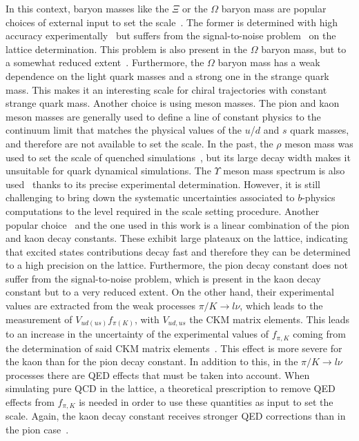 In this context, baryon masses like the $\Xi$ or the $\Omega$ baryon mass are popular choices of external input to set the scale~\citep{BMW:2012hcm,Miller:2020evg,RQCD_scale}. The former is determined with high accuracy experimentally~\citep{ParticleDataGroup:2020ssz} but suffers from the signal-to-noise problem~\citep{Lepage:1989hd,Luscher:2010ae} on the lattice determination. This problem is also present in the $\Omega$ baryon mass, but to a somewhat reduced extent~\citep{BMW:2012hcm,Miller:2020evg}. Furthermore, the $\Omega$ baryon mass has a weak dependence on the light quark masses and a strong one in the strange quark mass. This makes it an interesting scale for chiral trajectories with constant strange quark mass. Another choice is using meson masses. The pion and kaon meson masses are generally used to define a line of constant physics to the continuum limit that matches the physical values of the $u$/$d$ and $s$ quark masses, and therefore are not available to set the scale. In the past, the $\rho$ meson mass was used to set the scale of quenched simulations~\citep{Mawhinney:1996jk,Irving:1998yu,Bornyakov:2015plz}, but  its large decay width makes it unsuitable for quark dynamical simulations. The $\Upsilon$ meson mass spectrum is also used~\citep{HPQCD:2011qw,Gray:2005ur} thanks to its precise experimental determination. However, it is still challenging to bring down the systematic uncertainties associated to $b$-physics computations to the level required in the scale setting procedure. Another popular choice~\citep{Brown:2018jtv,BMW:2012hcm,BMW:2012hcm,Bruno:2016plf,Strassberger:2023xnj} and the one used in this work is a linear combination of the pion and kaon decay constants. These exhibit large plateaux on the lattice, indicating that excited states contributions decay fast and therefore they can be determined to a high precision on the lattice. Furthermore, the pion decay constant does not suffer from the signal-to-noise problem, which is present in the kaon decay constant but to a very reduced extent. On the other hand, their experimental values are extracted from the weak processes $\pi/K\to l\nu$, which leads to the measurement of $V_{ud(us)}f_{\pi(K)}$, with $V_{ud,us}$ the CKM matrix elements. This leads to an increase in the uncertainty of the experimental values of $f_{\pi,K}$ coming from the determination of said CKM matrix elements~\citep{FlavourLatticeAveragingGroupFLAG:2021npn}. This effect is more severe for the kaon than for the pion decay constant. In addition to this, in the $\pi/K\to l\nu$ processes there are QED effects that must be taken into account. When simulating pure QCD in the lattice, a theoretical prescription to remove QED effects from $f_{\pi,K}$ is needed in order to use these quantities as input to set the scale. Again, the kaon decay constant receives stronger QED corrections than in the pion case~\citep{FlavourLatticeAveragingGroupFLAG:2021npn}.

